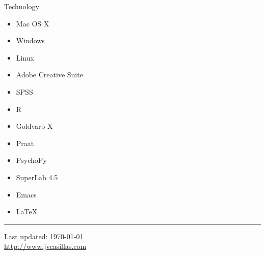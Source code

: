 \documentclass[11pt]{article}
\begin{document}
\noindent Technology
\begin{multicols}{3}
  \begin{itemize}
  \item Mac OS X \vspace{-0.1in}
  \item Windows \vspace{-0.1in}
  \item Linux \vspace{-0.1in}
  \item Adobe Creative Suite

  \item SPSS \vspace{-0.1in}
  \item R \vspace{-0.1in}
  \item Goldvarb X \vspace{-0.1in}
  \item Praat 

  \item PsychoPy \vspace{-0.1in}
  \item SuperLab 4.5 \vspace{-0.1in}
  \item Emacs \vspace{-0.1in}
  \item \LaTeX
  \end{itemize}
\end{multicols}

\noindent \rule{380pt}{.5 mm}

\smallskip

\begin{center}
  \begin{footnotesize}
    Last updated: \today \\
    \href{http://www.jvcasillas.com}{http://www.jvcasillas.com}
  \end{footnotesize}
\end{center}


\end{document}
